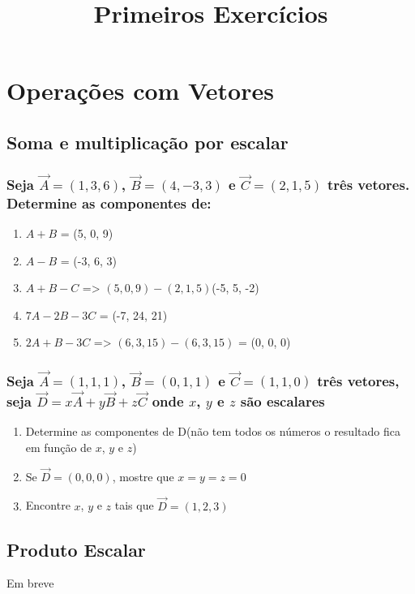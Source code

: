 \documentclass[a4paper,10pt]{article}
\title{Primeiros Exercícios}
\author{}
\begin{document}
\maketitle

\section{Operações com Vetores}

\subsection{Soma e multiplicação por escalar}

\subsubsection{Seja $\vec{A}=(1,3,6)$, $\vec{B}=(4,-3,3)$ e $\vec{C}=(2,1,5)$ três vetores. Determine as componentes de:}

\begin{enumerate}
 \item $A + B$ = 
 (5, 0, 9) 
 
 \item $A - B$ = 
 (-3, 6, 3)
 
 \item $A + B - C$ =>
  $(5, 0, 9) - (2, 1, 5)$(-5, 5, -2)
 
 \item $7A - 2B - 3C$ = 
 (-7, 24, 21)
 
 \item $2A + B - 3C$ => 
 $(6, 3, 15) - (6, 3, 15)$ = (0, 0, 0)

\end{enumerate}

\subsubsection{Seja $\vec{A}=(1,1,1)$, $\vec{B}=(0,1,1)$ e $\vec{C}=(1,1,0)$ três vetores, seja 
$\vec{D}=x\vec{A} + y\vec{B} + z\vec{C}$ onde $x$, $y$ e $z$ são escalares}

\begin{enumerate}
 \item Determine as componentes de D(não tem todos os números o resultado fica em função de $x$, $y$ e $z$)
 \item Se $\vec{D}=(0,0,0)$, mostre que $x=y=z=0$
 \item Encontre $x$, $y$ e $z$ tais que $\vec{D}=(1,2,3)$
\end{enumerate}

\subsection{Produto Escalar}

Em breve
\end{document}
